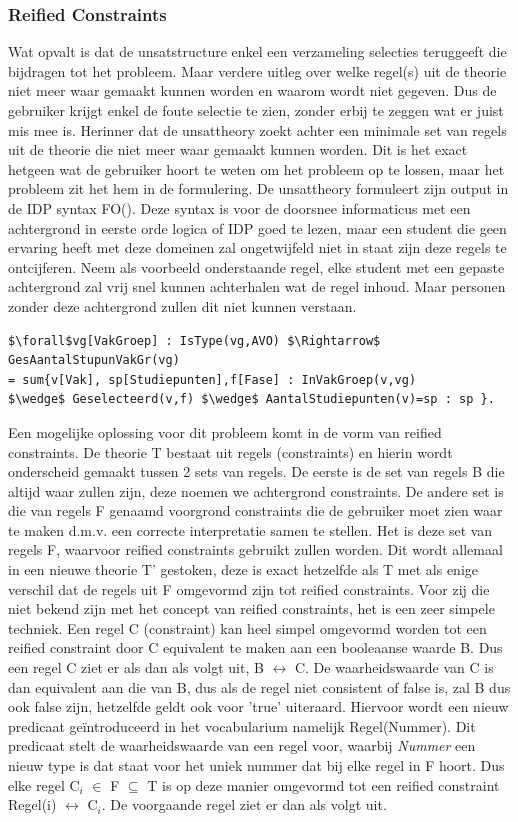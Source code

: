 \subsubsection{Reified Constraints}
\label{sec:reifiedconstraints}
Wat opvalt is dat de unsatstructure enkel een verzameling selecties teruggeeft die bijdragen tot het probleem. Maar verdere uitleg over welke regel(s) uit de theorie niet meer waar gemaakt kunnen worden en waarom wordt niet gegeven. Dus de gebruiker krijgt enkel de foute selectie te zien, zonder erbij te zeggen wat er juist mis mee is. Herinner dat de unsattheory zoekt achter een minimale set van regels uit de theorie die niet meer waar gemaakt kunnen worden. Dit is het exact hetgeen wat de gebruiker hoort te weten om het probleem op te lossen, maar het probleem zit het hem in de formulering. De unsattheory formuleert zijn output in de IDP syntax FO(\textperiodcentered). Deze syntax is voor de doorsnee informaticus met een achtergrond in eerste orde logica of IDP goed te lezen, maar een student die geen ervaring heeft met deze domeinen zal ongetwijfeld niet in staat zijn deze regels te ontcijferen. Neem als voorbeeld onderstaande regel, elke student met een gepaste achtergrond zal vrij snel kunnen achterhalen wat de regel inhoud. Maar personen zonder deze achtergrond zullen dit niet kunnen verstaan.
\lstset{basicstyle=\scriptsize}
\begin{lstlisting}[mathescape, caption=IDP Rule Example, frame=single]
$\forall$vg[VakGroep] : IsType(vg,AVO) $\Rightarrow$ GesAantalStupunVakGr(vg) 
= sum{v[Vak], sp[Studiepunten],f[Fase] : InVakGroep(v,vg) 
$\wedge$ Geselecteerd(v,f) $\wedge$ AantalStudiepunten(v)=sp : sp }.
\end{lstlisting}
Een mogelijke oplossing voor dit probleem komt in de vorm van reified constraints. De theorie T bestaat uit regels (constraints) en hierin wordt onderscheid gemaakt tussen 2 sets van regels. De eerste is de set van regels B die altijd waar zullen zijn, deze noemen we achtergrond constraints. De andere set is die van regels F genaamd voorgrond constraints die de gebruiker moet zien waar te maken d.m.v. een correcte interpretatie samen te stellen. Het is deze set van regels F, waarvoor reified constraints gebruikt zullen worden. Dit wordt allemaal in een nieuwe theorie T' gestoken, deze is exact hetzelfde als T met als enige verschil dat de regels uit F omgevormd zijn tot reified constraints. Voor zij die niet bekend zijn met het concept van reified constraints, het is een zeer simpele techniek. Een regel C (constraint) kan heel simpel omgevormd worden tot een reified constraint door C equivalent te maken aan een booleaanse waarde B. Dus een regel C ziet er als dan als volgt uit, B $\leftrightarrow$ C. De waarheidswaarde van C is dan equivalent aan die van B, dus als de regel niet consistent of false is, zal B dus ook false zijn, hetzelfde geldt ook voor 'true' uiteraard. Hiervoor wordt een nieuw predicaat ge\"{i}ntroduceerd in het vocabularium namelijk Regel(Nummer). Dit predicaat stelt de waarheidswaarde van een regel voor, waarbij \textit{Nummer} een nieuw type is dat staat voor het uniek nummer dat bij elke regel in F hoort. Dus elke regel  C$_{i}$ $\in$ F $\subseteq$ T is op deze manier omgevormd tot een reified constraint Regel(i) $\leftrightarrow$ C$_{i}$. De voorgaande regel ziet er dan als volgt uit. 
